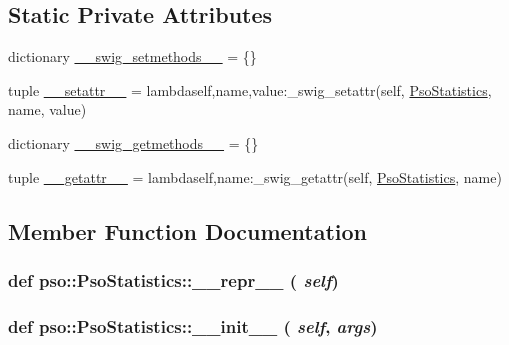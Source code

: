 \subsection*{Static Private Attributes}
\begin{CompactItemize}
\item 
dictionary \hyperlink{classpso_1_1PsoStatistics_4f34482049d8ceabd3c27e28ca82fed9}{\_\-\_\-swig\_\-setmethods\_\-\_\-} = \{\}
\item 
tuple \hyperlink{classpso_1_1PsoStatistics_ef4a87e97575cced9c7cf46cec7347f3}{\_\-\_\-setattr\_\-\_\-} = lambdaself,name,value:\_\-swig\_\-setattr(self, \hyperlink{classpso_1_1PsoStatistics}{PsoStatistics}, name, value)
\item 
dictionary \hyperlink{classpso_1_1PsoStatistics_9ae2c84553e36e6d46105a044143b2b1}{\_\-\_\-swig\_\-getmethods\_\-\_\-} = \{\}
\item 
tuple \hyperlink{classpso_1_1PsoStatistics_bcd79851d7b784545f23df27242e8811}{\_\-\_\-getattr\_\-\_\-} = lambdaself,name:\_\-swig\_\-getattr(self, \hyperlink{classpso_1_1PsoStatistics}{PsoStatistics}, name)
\end{CompactItemize}


\subsection{Member Function Documentation}
\hypertarget{classpso_1_1PsoStatistics_6a331c480554810f4d378e4c72ab5df6}{
\subsubsection{\setlength{\rightskip}{0pt plus 5cm}def pso::PsoStatistics::\_\-\_\-repr\_\-\_\- ( {\em self})}}
\label{classpso_1_1PsoStatistics_6a331c480554810f4d378e4c72ab5df6}


\hypertarget{classpso_1_1PsoStatistics_5ebd13cc8e53e3db6b09d161d72f7238}{
\subsubsection{\setlength{\rightskip}{0pt plus 5cm}def pso::PsoStatistics::\_\-\_\-init\_\-\_\- ( {\em self}, \/   {\em args})}}
\label{classpso_1_1PsoStatistics_5ebd13cc8e53e3db6b09d161d72f7238}




